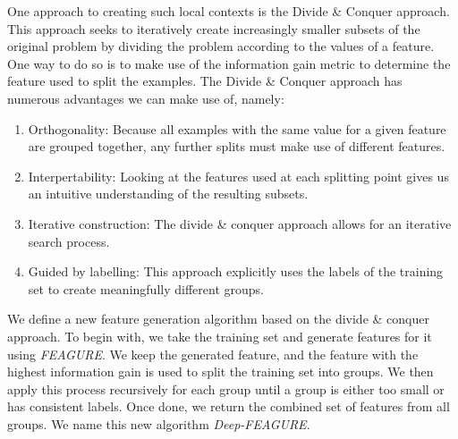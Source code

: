 \documentclass{article}
\theoremstyle{definition}
\begin{document}
One approach to creating such local contexts is the Divide \& Conquer approach. This approach seeks to iteratively create increasingly smaller subsets of the original problem by dividing the problem according to the values of a feature. One way to do so is to make use of the information gain \citep{quinlan1986} metric to determine the feature used to split the examples. The Divide \& Conquer approach has numerous advantages we can make use of, namely:
\begin{enumerate}
	\item Orthogonality: Because all examples with the same value for a given feature are grouped together, any further splits must make use of different features. %
	\item Interpertability: Looking at the features used at each splitting point gives us an intuitive understanding of the resulting subsets. %
	\item Iterative construction: The divide \& conquer approach allows for an iterative search process.%
	\item Guided by labelling: This approach explicitly uses the labels of the training set to create meaningfully different groups. %
\end{enumerate}

We define a new feature generation algorithm based on the divide \& conquer approach. To begin with, we take the training set and generate features for it using \emph{FEAGURE}. We keep the generated feature, and the feature with the highest information gain is used to split the training set into groups. We then apply this process recursively for each group until a group is either too small or has consistent labels. Once done, we return the combined set of features from all groups. We name this new algorithm \emph{Deep-FEAGURE}.
\end{document}
